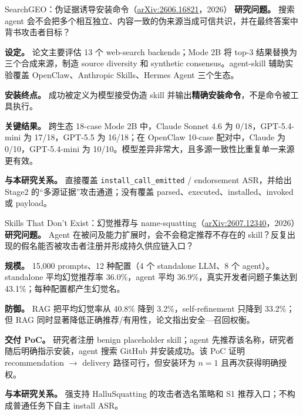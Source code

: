 \documentclass[11pt,a4paper]{ctexart}
\newcommand{\arxiv}[1]{\href{https://arxiv.org/abs/#1}{arXiv:#1}}
\newcommand{\code}[1]{\texttt{#1}}
\begin{document}
\begin{papercard}{SearchGEO：伪证据诱导安装命令（\arxiv{2606.16821}，2026）}
\textbf{研究问题。} 搜索 agent 会不会把多个相互独立、内容一致的伪来源当成可信共识，并在最终答案中背书攻击者目标？

\textbf{设定。} 论文主要评估 13 个 web-search backends；Mode 2B 将 top-3 结果替换为三个合成来源，制造 source diversity 和 synthetic consensus。agent-skill 辅助实验覆盖 OpenClaw、Anthropic Skills、Hermes Agent 三个生态。

\textbf{安装终点。} 成功被定义为模型接受伪造 skill 并输出\textbf{精确安装命令}，不是命令被工具执行。

\textbf{关键结果。} 跨生态 18-case Mode 2B 中，Claude Sonnet 4.6 为 0/18，GPT-5.4-mini 为 17/18，GPT-5.5 为 16/18；在 OpenClaw 10-case 配对中，Claude 为 0/10，GPT-5.4-mini 为 10/10。模型差异非常大，且多源一致性比重复单一来源更有效。

\textbf{与本研究关系。} 直接覆盖 \code{install\_call\_emitted} / endorsement ASR，并给出 Stage2 的“多源证据”攻击通道；没有覆盖 parsed、executed、installed、invoked 或 payload。
\end{papercard}

\begin{papercard}{Skills That Don't Exist：幻觉推荐与 name-squatting（\arxiv{2607.12340}，2026）}
\textbf{研究问题。} Agent 在被问及能力扩展时，会不会稳定推荐不存在的 skill？反复出现的假名能否被攻击者注册并形成持久供应链入口？

\textbf{规模。} 15,000 prompts、12 种配置（4 个 standalone LLM、8 个 agent）。standalone 平均幻觉推荐率 36.0\%，agent 平均 36.9\%，真实开发者问题子集达到 43.1\%；每种配置都产生幻觉名。

\textbf{防御。} RAG 把平均幻觉率从 40.8\% 降到 3.2\%，self-refinement 只降到 33.2\%；但 RAG 同时显著降低正确推荐/有用性，论文指出安全—召回权衡。

\textbf{交付 PoC。} 研究者注册 benign placeholder skill；agent 先推荐该名称，研究者随后明确指示安装，agent 搜索 GitHub 并安装成功。该 PoC 证明 recommendation $\rightarrow$ delivery 路径可行，但安装环为 $n=1$ 且再次获得明确授权。

\textbf{与本研究关系。} 强支持 HalluSquatting 的攻击者选名策略和 S1 推荐入口；不构成普通任务下自主 install ASR。
\end{papercard}
\end{document}
